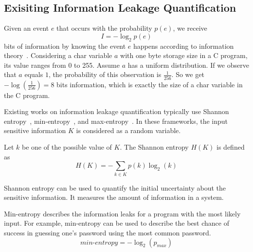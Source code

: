 
\subsection{Exisiting Information Leakage Quantification}\label{sec:background_leak}

Given an event $e$ that occurs with the probability $p(e)$, we receive
\begin{displaymath}
    I = - \log_2p(e)
\end{displaymath}
bits of information by knowing the event $e$ happens according to information theory~\cite{shannon1948mathematical}. 
Considering a char variable $a$
with one byte storage size in a C program, its value ranges from 0 to 255.
Assume $a$ has a uniform distribution. If we observe that
$a$ equals $1$, the probability of this observation is $\frac{1}{256}$. So 
we get $-\log(\frac{1}{256}) = 8$ bits information, which is exactly the size
of a char variable in the C program.

Existing works on information leakage quantification typically use Shannon
entropy~\cite{Wichelmann:2018:MFF:3274694.3274741},
min-entropy~\cite{10.1007/978-3-642-00596-1_21}, and max-entropy~\cite{182946,
Doychev:2017:RAS:3062341.3062388}. In these frameworks, the input sensitive
information $K$ is considered as a random variable.

Let $k$ be one of the possible
value of $K$. The Shannon entropy $H(K)$ is defined as
\begin{displaymath}
    H(K) = - \sum_{k {\in} K}p(k)\log_2(k)
\end{displaymath}

Shannon entropy can be used to quantify the initial uncertainty about the
sensitive information. It measures the amount of information in a system.

Min-entropy describes the information leaks for a program with the most likely input. 
For example, min-entropy can be used to describe the
best chance of success in guessing one's password using the
most common password. %
\begin{displaymath}
    \mathit{min\text{-}entropy} = - \log_2(p_{\mathit{max}})
\end{displaymath}

